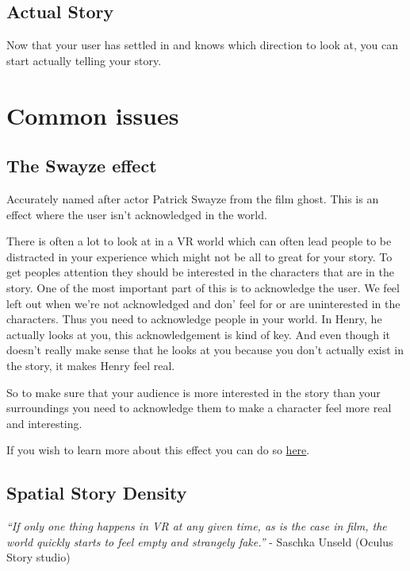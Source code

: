 \documentclass{report}
\begin{document}
				\subsection{Actual Story}
				Now that your user has settled in and knows which direction to look at, you can start actually telling your story.

				
				\section{Common issues}
				
				\subsection{The Swayze effect}
				Accurately named after actor Patrick Swayze from the film ghost. This is an effect where the user isn't acknowledged in the world.
				
				There is often a lot to look at in a VR world which can often lead people to be distracted in your experience which might not be all to great for your story. To get peoples attention they should be interested in the characters that are in the story. One of the most important part of this is to acknowledge the user. We feel left out when we're not acknowledged and don' feel for or are uninterested in the characters. Thus you need to acknowledge people in your world. In Henry, he actually looks at you, this acknowledgement is kind of key. And even though it doesn't really make sense that he looks at you because you don't actually exist in the story, it makes Henry feel real.
				
				So to make sure that your audience is more interested in the story than your surroundings you need to acknowledge them to make a character feel more real and interesting.
				
				If you wish to learn more about this effect you can do so  \href{https://www.oculus.com/story-studio/blog/the-swayze-effect/}{here}.
				
				\subsection{Spatial Story Density}
				\textit{``If only one thing happens in VR at any given time, as is the case in film, the world quickly starts to feel empty and strangely fake.''} - Saschka Unseld (Oculus Story studio)
\end{document}
